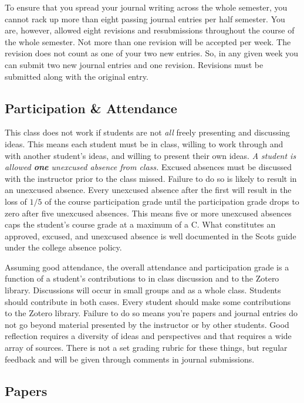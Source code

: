 \documentclass[nobib]{tufte-handout}
\begin{document}
To ensure that you spread your journal writing across the whole semester, you cannot rack up more than eight passing journal entries per half semester. You are, however, allowed eight revisions and resubmissions throughout the course of the whole semester. Not more than one revision will be accepted per week. The revision does not count as one of your two new entries. So, in any given week you can submit two new journal entries and one revision. Revisions must be submitted along with the original entry. 


\subsection{Participation \& Attendance}

This class does not work if students are not \textit{all} freely presenting and discussing ideas.  This means each student must be in class, willing to work through and with another student's ideas, and willing to present their own ideas.  \textit{A student is allowed \textbf{one} unexcused absence from class.} Excused absences must be discussed with the instructor prior to the class missed.  Failure to do so is likely to result in an unexcused absence.  Every unexcused absence after the first will result in the loss of $1/5$ of the course participation grade until the participation grade drops to zero after five unexcused absences. This means five or more unexcused absences caps the student's course grade at a maximum of a C. What constitutes an approved, excused, and unexcused absence is well documented in the Scots guide under the college absence policy. 

Assuming good attendance, the overall attendance and participation grade is a function of a student's contributions to in class discussion and to the Zotero library.  Discussions will occur in small groups and as a whole class. Students should contribute in both cases. Every student should make some contributions to the Zotero library.  Failure to do so means you're papers and journal entries do not go beyond material presented by the instructor or by other students.  Good reflection requires a diversity of ideas and perspectives and that requires a wide array of sources. There is not a set grading rubric for these things, but regular feedback and will be given through comments in journal submissions. 

\subsection{Papers}
\end{document}
